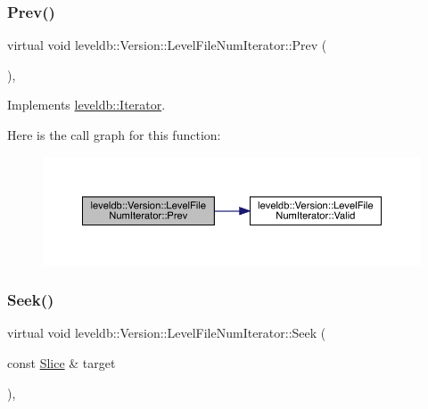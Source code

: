 \subsubsection{\texorpdfstring{Prev()}{Prev()}}
{\footnotesize\ttfamily virtual void leveldb\+::\+Version\+::\+Level\+File\+Num\+Iterator\+::\+Prev (\begin{DoxyParamCaption}{ }\end{DoxyParamCaption})\hspace{0.3cm}{\ttfamily [inline]}, {\ttfamily [virtual]}}



Implements \mbox{\hyperlink{classleveldb_1_1_iterator_a28798d802a203788587dc6adc5bc729e}{leveldb\+::\+Iterator}}.

Here is the call graph for this function\+:
\nopagebreak
\begin{figure}[H]
\begin{center}
\leavevmode
\includegraphics[width=350pt]{classleveldb_1_1_version_1_1_level_file_num_iterator_ab39c60a98d579590231034fdb665cb42_cgraph}
\end{center}
\end{figure}
\mbox{\label{classleveldb_1_1_version_1_1_level_file_num_iterator_adbe855f4a783c2f578e1ff2fbb5259b2}} 
\subsubsection{\texorpdfstring{Seek()}{Seek()}}
{\footnotesize\ttfamily virtual void leveldb\+::\+Version\+::\+Level\+File\+Num\+Iterator\+::\+Seek (\begin{DoxyParamCaption}\item[{const \mbox{\hyperlink{classleveldb_1_1_slice}{Slice}} \&}]{target }\end{DoxyParamCaption})\hspace{0.3cm}{\ttfamily [inline]}, {\ttfamily [virtual]}}




